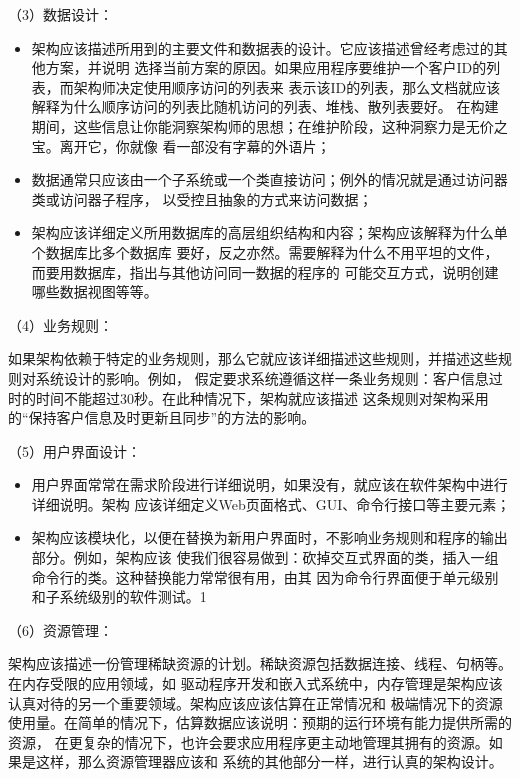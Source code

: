 \documentclass{article}
\begin{document}
\par
（3）数据设计：
\begin{itemize}
    \item 架构应该描述所用到的主要文件和数据表的设计。它应该描述曾经考虑过的其他方案，并说明
    选择当前方案的原因。如果应用程序要维护一个客户ID的列表，而架构师决定使用顺序访问的列表来
    表示该ID的列表，那么文档就应该解释为什么顺序访问的列表比随机访问的列表、堆栈、散列表要好。
    在构建期间，这些信息让你能洞察架构师的思想；在维护阶段，这种洞察力是无价之宝。离开它，你就像
    看一部没有字幕的外语片；
    \item 数据通常只应该由一个子系统或一个类直接访问；例外的情况就是通过访问器类或访问器子程序，
    以受控且抽象的方式来访问数据；
    \item 架构应该详细定义所用数据库的高层组织结构和内容；架构应该解释为什么单个数据库比多个数据库
    要好，反之亦然。需要解释为什么不用平坦的文件，而要用数据库，指出与其他访问同一数据的程序的
    可能交互方式，说明创建哪些数据视图等等。
\end{itemize}

\par
（4）业务规则：
\par
如果架构依赖于特定的业务规则，那么它就应该详细描述这些规则，并描述这些规则对系统设计的影响。例如，
假定要求系统遵循这样一条业务规则：客户信息过时的时间不能超过30秒。在此种情况下，架构就应该描述
这条规则对架构采用的“保持客户信息及时更新且同步”的方法的影响。

\par
（5）用户界面设计：
\par
\begin{itemize}
    \item 用户界面常常在需求阶段进行详细说明，如果没有，就应该在软件架构中进行详细说明。架构
    应该详细定义Web页面格式、GUI、命令行接口等主要元素；
    \item 架构应该模块化，以便在替换为新用户界面时，不影响业务规则和程序的输出部分。例如，架构应该
    使我们很容易做到：砍掉交互式界面的类，插入一组命令行的类。这种替换能力常常很有用，由其
    因为命令行界面便于单元级别和子系统级别的软件测试。1
\end{itemize}

（6）资源管理：
\par
架构应该描述一份管理稀缺资源的计划。稀缺资源包括数据连接、线程、句柄等。在内存受限的应用领域，如
驱动程序开发和嵌入式系统中，内存管理是架构应该认真对待的另一个重要领域。架构应该应该估算在正常情况和
极端情况下的资源使用量。在简单的情况下，估算数据应该说明：预期的运行环境有能力提供所需的资源，
在更复杂的情况下，也许会要求应用程序更主动地管理其拥有的资源。如果是这样，那么资源管理器应该和
系统的其他部分一样，进行认真的架构设计。
\end{document}
